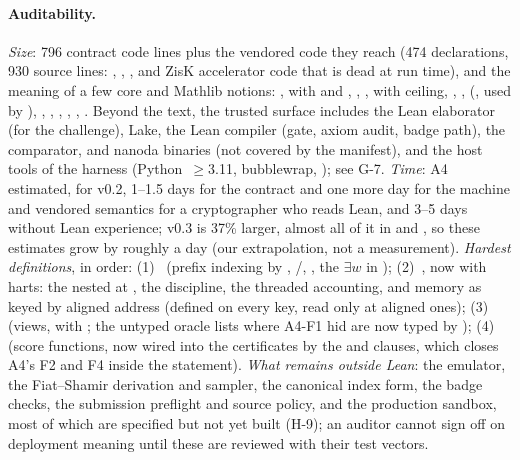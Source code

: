 \paragraph{Auditability.} \emph{Size}: 796 contract code lines plus the vendored code they reach
(474 declarations, 930 source lines: , , , and
ZisK accelerator code that is dead at run time), and the meaning of a few core and Mathlib notions:
,  with  and , , ,
 with ceiling, , , \lean{![…]} (, used by
), , , , ,
, . Beyond the text, the trusted surface includes the Lean
elaborator (for the challenge), Lake, the Lean compiler (gate, axiom audit, badge path), the
comparator,  and nanoda binaries (not covered by the  manifest), and
the host tools of the harness (Python~$\ge$3.11, bubblewrap, ); see G-7.
\emph{Time}: A4 estimated, for v0.2, 1--1.5 days for the contract and one more day for the machine and
vendored semantics for a cryptographer who reads Lean, and 3--5 days without Lean experience; v0.3
is 37\% larger, almost all of it in  and , so these estimates
grow by roughly a day (our extrapolation, not a measurement). \emph{Hardest definitions}, in order:
(1)~ (prefix indexing by , /,
, the $\exists w$ in ); (2)~, now with harts: the
nested  at , the  discipline, the threaded accounting, and
memory as  keyed by aligned address (defined on every key, read only at aligned
ones); (3)~ (views,  with ; the untyped
oracle lists where A4-F1 hid are now typed by ); (4)~ (score
functions, now wired into the certificates by the  and  clauses, which
closes A4's F2 and F4 inside the statement). \emph{What remains outside Lean}: the emulator, the
Fiat--Shamir derivation and sampler, the canonical index form, the badge checks, the submission
preflight and source policy, and the production sandbox, most of which are specified but not yet
built (H-9); an auditor cannot sign off on deployment meaning until these are reviewed with
their test vectors.
\endgroup
